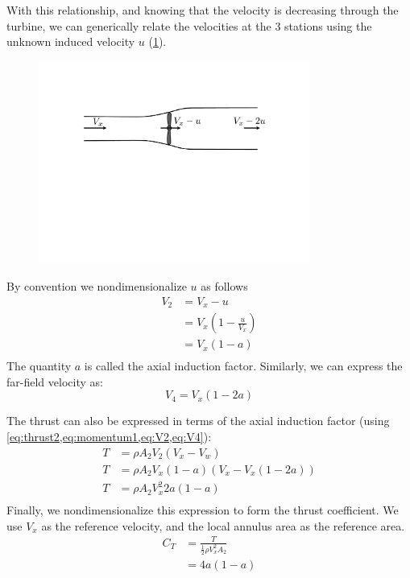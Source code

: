 \documentclass{article}
\begin{document}
With this relationship, and knowing that the velocity is decreasing through the turbine, we can generically relate the velocities at the 3 stations using the unknown induced velocity $u$ (\cref{fig:velocity-deficit}).
\begin{figure}[htbp]
\centering
\includegraphics[width=3.5in]{figures/velocity-deficit1}
\caption{}
\label{fig:velocity-deficit}
\end{figure}
By convention we nondimensionalize $u$ as follows
\begin{equation}
\begin{aligned}
V_2 &= V_x - u\\
&= V_x\left(1 - \frac{u}{V_x}\right)\\
&= V_x\left(1 - a\right)\\
\end{aligned}
\label{eq:V2}
\end{equation}
The quantity $a$ is called the axial induction factor.  Similarly, we can express the far-field velocity as:
\begin{equation}
    V_4 = V_x(1 - 2a)
    \label{eq:V4}
\end{equation}

The thrust can also be expressed in terms of the axial induction factor (using \cref{eq:thrust2,eq:momentum1,eq:V2,eq:V4}):
\begin{equation}
\begin{aligned}
    T &= \rho A_2 V_2 (V_x - V_w)\\
    T &= \rho A_2 V_x(1-a) (V_x - V_x(1-2a))\\
    T &= \rho A_2 V_x^2 2a (1-a) \\
\end{aligned}
\label{eq:momT}
\end{equation}
Finally, we nondimensionalize this expression to form the thrust coefficient.  We use $V_x$ as the reference velocity, and the local annulus area as the reference area.
\begin{equation}
\begin{aligned}
    C_T &= \frac{T}{\frac{1}{2}\rho V_x^2 A_2}\\
     &= 4 a (1 - a)
    \label{eq:CTmom}
\end{aligned}
\end{equation}
\end{document}
